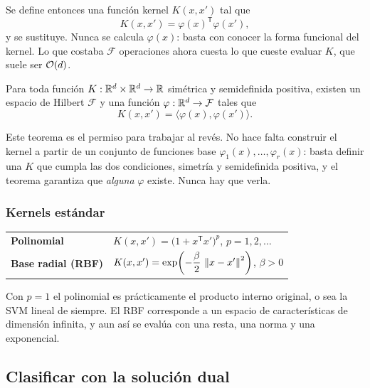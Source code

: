 \documentclass[11pt,letterpaper]{article}
\begin{document}
Se define entonces una función kernel $K(x, x')$ tal que
\[
    K(x, x') = \varphi(x)^{\mathsf{T}} \varphi(x') ,
\]
y se sustituye. Nunca se calcula $\varphi(x)$: basta con conocer la
forma funcional del kernel. Lo que costaba $\mathcal{F}$ operaciones
ahora cuesta lo que cueste evaluar $K$, que suele ser $\mathcal{O}\!\left(d\right)$.

\begin{teorema}[Mercer]
  Para toda función $K : \mathbb{R}^{d} \times \mathbb{R}^{d} \to \mathbb{R}$ simétrica y
  semidefinida positiva, existen un espacio de Hilbert $\mathcal{F}$ y
  una función $\varphi : \mathbb{R}^{d} \to \mathcal{F}$ tales que
  \[
      K(x, x') = \langle \varphi(x), \varphi(x') \rangle .
  \]
\end{teorema}

\begin{idea}
  Este teorema es el permiso para trabajar al revés. No hace falta
  construir el kernel a partir de un conjunto de funciones base
  $\varphi_1(x), \ldots, \varphi_r(x)$: basta definir una $K$ que
  cumpla las dos condiciones, simetría y semidefinida positiva, y el
  teorema garantiza que \emph{alguna} $\varphi$ existe. Nunca hay que
  verla.
\end{idea}

\subsubsection*{Kernels estándar}

\begin{center}
\begin{tabular}{ll}
    \toprule
    \textbf{Polinomial} &
      $K(x, x') = \big(1 + x^{\mathsf{T}} x'\big)^{p}$,
      \quad $p = 1, 2, \ldots$ \\[0.4em]
    \textbf{Base radial (RBF)} &
      $K(x, x') = \exp\!\left(
      -\dfrac{\beta}{2}\,\left\lVert x - x' \right\rVert^{2}\right)$,
      \quad $\beta > 0$ \\
    \bottomrule
\end{tabular}
\end{center}

Con $p = 1$ el polinomial es prácticamente el producto interno
original, o sea la SVM lineal de siempre. El RBF corresponde a un
espacio de características de dimensión infinita, y aun así se evalúa
con una resta, una norma y una exponencial.


\subsection*{Clasificar con la solución dual}
\end{document}
